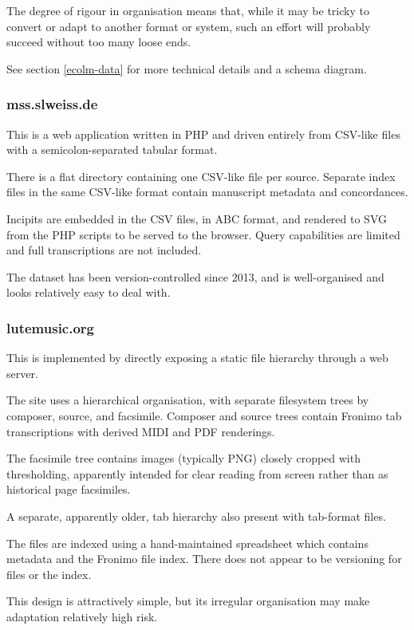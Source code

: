 \documentclass[sigconf, nonacm=true]{acmart}
\begin{document}
\begin{sloppypar}
  The degree of rigour in organisation means that, while it may be
  tricky to convert or adapt to another format or system, such an
  effort will probably succeed without too many loose ends.

  See section \ref{ecolm-data} for more technical details and a schema
  diagram.

  \subsubsection{mss.slweiss.de}

  This is a web application written in PHP and driven entirely from
  CSV-like files with a semicolon-separated tabular format.
  
  There is a flat directory containing one CSV-like file per source.
  Separate index files in the same CSV-like format contain manuscript
  metadata and concordances.

  Incipits are embedded in the CSV files, in ABC format, and rendered
  to SVG from the PHP scripts to be served to the browser. Query
  capabilities are limited and full transcriptions are not included.

  The dataset has been version-controlled since 2013, and is
  well-organised and looks relatively easy to deal with.
  
  \subsubsection{lutemusic.org}

  This is implemented by directly exposing a static file hierarchy
  through a web server.
  
  The site uses a hierarchical organisation, with separate filesystem
  trees by composer, source, and facsimile. Composer and source trees
  contain Fronimo tab transcriptions with derived MIDI and PDF
  renderings.
  
  The facsimile tree contains images (typically PNG) closely cropped
  with thresholding, apparently intended for clear reading from screen
  rather than as historical page facsimiles.
    
  A separate, apparently older, tab hierarchy also present with
  tab-format files.
  
  The files are indexed using a hand-maintained spreadsheet which
  contains metadata and the Fronimo file index. There does not appear
  to be versioning for files or the index.
  
  This design is attractively simple, but its irregular organisation
  may make adaptation relatively high risk.
    

\end{sloppypar}
\end{document}
